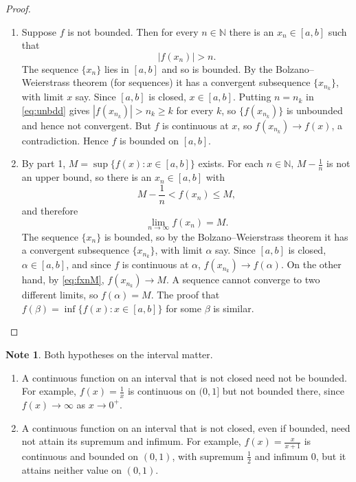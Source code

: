\documentclass[11pt,a4paper]{article}
\numberwithin{equation}{section}
\theoremstyle{definition}
\newtheorem*{note}{Note}
\begin{document}
\begin{proof}
\begin{enumerate}
\item Suppose $f$ is not bounded. Then for every $n\in \mathbb{N}$ there is an $x_n \in [a,b]$ such that
\begin{equation}\label{eq:unbdd}
|f(x_n)| > n .
\end{equation}
The sequence $\{x_n\}$ lies in $[a,b]$ and so is bounded. By the Bolzano--Weierstrass theorem (for sequences) it has a convergent subsequence $\{x_{n_k}\}$, with limit $x$ say. Since $[a,b]$ is closed, $x\in [a,b]$. Putting $n = n_k$ in \eqref{eq:unbdd} gives $|f(x_{n_k})| > n_k \geq k$ for every $k$, so $\{f(x_{n_k})\}$ is unbounded and hence not convergent. But $f$ is continuous at $x$, so $f(x_{n_k}) \longrightarrow f(x)$, a contradiction. Hence $f$ is bounded on $[a,b]$.

\item By part 1, $M = \sup \{f(x): x\in [a,b]\}$ exists. For each $n\in \mathbb{N}$, $M - \frac{1}{n}$ is not an upper bound, so there is an $x_n \in [a,b]$ with
$$M - \frac{1}{n} < f(x_n) \leq M,$$
and therefore
\begin{equation}\label{eq:fxnM}
\lim_{n\rightarrow \infty} f(x_n) = M .
\end{equation}
The sequence $\{x_n\}$ is bounded, so by the Bolzano--Weierstrass theorem it has a convergent subsequence $\{x_{n_k}\}$, with limit $\alpha$ say. Since $[a,b]$ is closed, $\alpha \in [a,b]$, and since $f$ is continuous at $\alpha$, $f( x_{n_k})\longrightarrow f(\alpha)$. On the other hand, by \eqref{eq:fxnM}, $f(x_{n_k})\longrightarrow M$. A sequence cannot converge to two different limits, so $f(\alpha) = M$. The proof that $f(\beta) = \inf \{ f(x): x \in [a,b]\}$ for some $\beta$ is similar.
\end{enumerate}
\end{proof}

\begin{note}
Both hypotheses on the interval matter.
\begin{enumerate}
\item A continuous function on an interval that is not closed need not be bounded. For example, $f(x) = \frac{1}{x}$ is continuous on $(0,1]$ but not bounded there, since $f(x)\longrightarrow\infty$ as $x\longrightarrow 0^+$.
\item A continuous function on an interval that is not closed, even if bounded, need not attain its supremum and infimum. For example, $f(x) = \frac{x}{x + 1}$ is continuous and bounded on $(0,1)$, with supremum $\frac{1}{2}$ and infimum $0$, but it attains neither value on $(0,1)$.
\end{enumerate}
\end{note}
\end{document}
